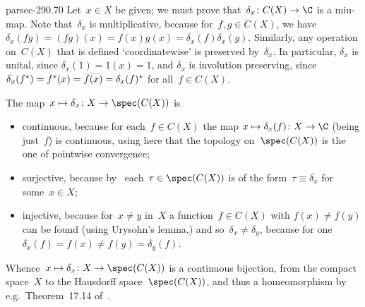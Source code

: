\documentclass[b5page]{book}
\begin{document}
\begin{solution}{parsec-290.70}
Let~$x\in X$ be given;
  we must  prove that~$\delta_x\colon C(X)\to\C$ is a miu-map.
Note that~$\delta_x$ is multiplicative,
because for~$f,g\in C(X)$,
we have $\delta_x(fg)=(fg)(x)=f(x)g(x)=\delta_x(f)\delta_x(g)$.
Similarly, any operation on~$C(X)$ that is defined `coordinatewise'
is preserved by~$\delta_x$. In particular,
$\delta_x$ is unital, since $\delta_x(1)=1(x)=1$,
and $\delta_x$ is involution preserving,
since~$\delta_x(f^*)=f^*(x)=\smash{\overline{f(x)}}=\delta_x(f)^*$
for all~$f\in C(X)$.

The map~$x\mapsto \delta_x\colon X\to \spec(C(X))$
is 
\begin{itemize}
\item
continuous,
because for each~$f\in C(X)$
the map  $x\mapsto \delta_x(f)\colon X\to\C$ (being just~$f$) is continuous,
using here that the topology on~$\spec(C(X))$ 
is the one of pointwise convergence;
\item
surjective,
because by~
each~$\tau \in \spec(C(X))$
is of the form~$\tau\equiv \delta_x$
for some~$x\in X$;
\item
injective,
because for~$x\neq y$ in~$X$
a function~$f\in C(X)$ with $f(x)\neq f(y)$
    can be found (using Urysohn's lemma,)
and so~$\delta_x\neq \delta_y$,
because for one $\delta_x(f)=f(x)\neq f(y)=\delta_y(f)$.
\end{itemize}
Whence~$x\mapsto \delta_x\colon X\to \spec(C(X))$
is a continuous bijection,
  from the compact space~$X$
  to the Hausdorff space~$\spec(C(X))$,
  and thus a homeomorphism
  by e.g.~Theorem~17.14 of~\cite{willard}.
\end{solution}
\end{document}
